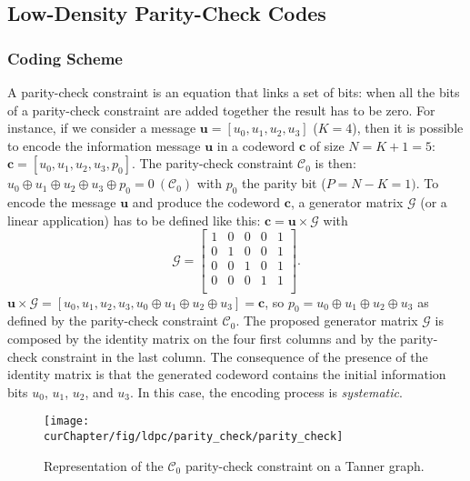 \subsection{Low-Density Parity-Check Codes}
\label{sec:ctx_ldpc}

\subsubsection{Coding Scheme}

A parity-check constraint is an equation that links a set of bits: when all the
bits of a parity-check constraint are added together the result has to be
zero. For instance, if we consider a message $\bm{u} = [u_0, u_1, u_2, u_3]$
($K = 4$), then it is possible to encode the information message $\bm{u}$ in a
codeword $\bm{c}$ of size $N = K + 1 = 5$: $\bm{c} = [u_0,u_1,u_2,u_3,p_0]$.
The parity-check constraint $\mathcal{C}_0$ is then: $u_0 \oplus u_1 \oplus u_2
\oplus u_3 \oplus p_0 = 0~(\mathcal{C}_0)$ with $p_0$ the parity bit ($P = N -
K = 1)$. To encode the message $\bm{u}$ and produce the codeword $\bm{c}$, a
generator matrix $\bm{\mathcal{G}}$ (or a linear application) has to be defined
like this: $\bm{c} = \bm{u} \times \bm{\mathcal{G}}$ with
\begin{equation*}
\bm{\mathcal{G}} =
\begin{bmatrix}
1 & 0 & 0 & 0 & 1\\
0 & 1 & 0 & 0 & 1\\
0 & 0 & 1 & 0 & 1\\
0 & 0 & 0 & 1 & 1\\
\end{bmatrix}
.
\end{equation*}
$\bm{u} \times \bm{\mathcal{G}} = [u_0,u_1,u_2,u_3,u_0 \oplus u_1 \oplus u_2
\oplus u_3] = \bm{c}$, so $p_0 = u_0 \oplus u_1 \oplus u_2 \oplus u_3$ as
defined by the parity-check constraint $\mathcal{C}_0$. The proposed
generator matrix $\bm{\mathcal{G}}$ is composed by the identity matrix on the
four first columns and by the parity-check constraint in the last column.
The consequence of the presence of the identity matrix is that the generated
codeword contains the initial information bits $u_0$, $u_1$, $u_2$, and $u_3$.
In this case, the encoding process is \emph{systematic}.

\begin{figure}[htp]
  \centering
  \texttt{[image: \\curChapter/fig/ldpc/parity\_check/parity\_check]}
  \caption{Representation of the $\mathcal{C}_0$ parity-check constraint on a
    Tanner graph.}
  \label{fig:ctx_ldpc_parity_check}
\end{figure}

